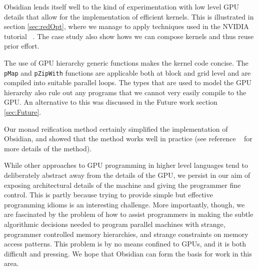 

Obsidian lends itself well to the kind of experimentation with low level 
GPU details that allow for the implementation of efficient kernels. This is 
illustrated in section \ref{sec:redOpt}, where we manage to apply techniques
used in the NVIDIA tutorial ~. The case study also show hows we 
can compose kernels and thus reuse prior effort. 

The use of GPU hierarchy generic functions makes the kernel code concise. The 
{\tt pMap} and {\tt pZipWith} functions are applicable both at block and grid 
level and are compiled into suitable parallel loops. The types that are used 
to model the GPU hierarchy also rule out any programs that we cannot 
very easily compile to the GPU. An alternative to this was discussed in 
the Future work section \ref{sec:Future}.


Our monad reification method certainly simplified
the implementation of Obsidian, and showed that the method works
well in practice (see reference ~ for more details of the method).

While other approaches to GPU programming in higher level languages tend to deliberately abstract away from the details of the GPU, we persist in our aim of exposing architectural details of
the machine and giving the programmer fine control.
This is partly because trying to provide simple
but effective programming idioms is an interesting challenge.
More importantly, though, we are fascinated
by the problem of how to assist
programmers in making the subtle algorithmic decisions needed
to program
parallel machines with strange, programmer controlled
 memory hierarchies, and strange
constraints on memory access patterns. This problem is by no means
confined to GPUs, and it is both difficult and pressing.
We hope that Obsidian can form the basis for work in this area.




